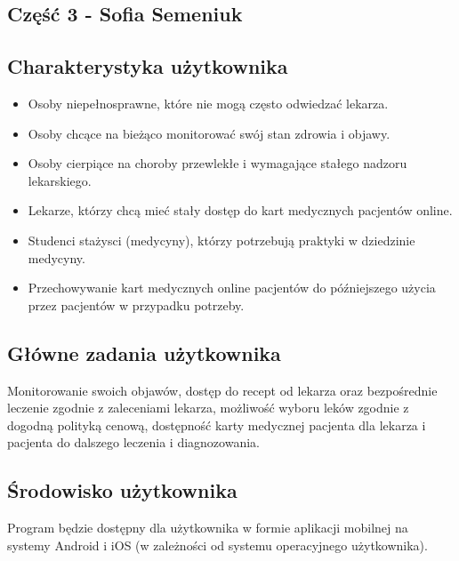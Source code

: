 \begin{center}
  \section{Część 3 - Sofia Semeniuk}
  \subsection{Charakterystyka użytkownika}
\end{center}

\begin{itemize}
  \item Osoby niepełnosprawne, które nie mogą często odwiedzać lekarza.
  \item Osoby chcące na bieżąco monitorować swój stan zdrowia i objawy.
  \item Osoby cierpiące na choroby przewlekłe i wymagające stałego nadzoru lekarskiego.
  \item Lekarze, którzy chcą mieć stały dostęp do kart medycznych pacjentów online. 
  \item Studenci stażysci (medycyny), którzy potrzebują praktyki w dziedzinie medycyny.
  \item Przechowywanie kart medycznych online pacjentów do późniejszego użycia przez pacjentów w przypadku potrzeby.
\end{itemize}

\begin{center}
  \subsection{Główne zadania użytkownika}
\end{center}

Monitorowanie swoich objawów, dostęp do recept od lekarza oraz bezpośrednie leczenie zgodnie z zaleceniami lekarza, możliwość wyboru leków zgodnie z dogodną polityką cenową, dostępność karty medycznej pacjenta dla lekarza i pacjenta do dalszego leczenia i diagnozowania.

\begin{center}
  \subsection{Środowisko użytkownika}
\end{center}

Program będzie dostępny dla użytkownika w formie aplikacji mobilnej na systemy Android i iOS (w zależności od systemu operacyjnego użytkownika).




